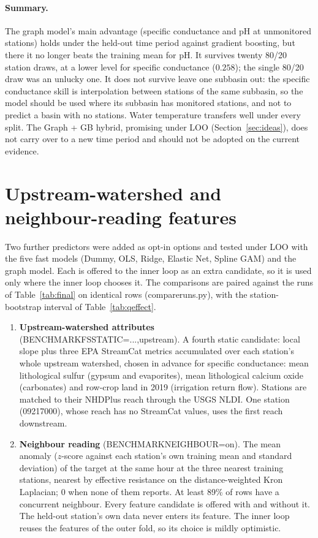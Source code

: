 \documentclass[11pt]{article}
\newcommand{\codeus}{\textunderscore\allowbreak}
\newcommand{\code}[1]{{\ttfamily\let\_\codeus #1}}
\begin{document}
\paragraph{Summary.} The graph model's main advantage (specific conductance and pH at unmonitored
stations) holds under the held-out time period against gradient boosting, but there it no longer
beats the training mean for pH. It survives twenty 80/20 station draws, at a lower level for
specific conductance ($0.258$); the single 80/20 draw was an unlucky one. It does not survive leave
one subbasin out: the specific conductance skill is interpolation between stations of the same
subbasin, so the model should be used where its subbasin has monitored stations, and not to
predict a basin with no stations. Water temperature transfers well under every split. The Graph +
GB hybrid, promising under LOO (Section~\ref{sec:ideas}), does not carry over to a new time period
and should not be adopted on the current evidence.

\section{Upstream-watershed and neighbour-reading features}
\label{sec:features}

Two further predictors were added as opt-in options and tested under LOO with the five fast models
(Dummy, OLS, Ridge, Elastic Net, Spline GAM) and the graph model. Each is offered to the inner loop
as an extra candidate, so it is used only where the inner loop chooses it. The comparisons are paired
against the runs of Table~\ref{tab:final} on identical rows (\code{compare\_runs.py}), with the
station-bootstrap interval of Table~\ref{tab:qeffect}.
\begin{enumerate}
  \item \textbf{Upstream-watershed attributes} (\code{BENCHMARK\_FS\_STATIC=...,upstream}). A fourth
        static candidate: local slope plus three EPA StreamCat metrics accumulated over each
        station's whole upstream watershed, chosen in advance for specific conductance: mean
        lithological sulfur (gypsum and evaporites), mean lithological calcium oxide (carbonates)
        and row-crop land in 2019 (irrigation return flow). Stations are matched to their NHDPlus
        reach through the USGS NLDI. One station (09217000), whose reach has no StreamCat values,
        uses the first reach downstream.
  \item \textbf{Neighbour reading} (\code{BENCHMARK\_NEIGHBOUR=on}). The mean anomaly ($z$-score
        against each station's own training mean and standard deviation) of the target at the same
        hour at the three nearest training stations, nearest by effective resistance on the
        distance-weighted Kron Laplacian; $0$ when none of them reports. At least 89\% of rows have
        a concurrent neighbour. Every feature candidate is offered with and without it. The
        held-out station's own data never enters its feature. The inner loop reuses the features
        of the outer fold, so its choice is mildly optimistic.
\end{enumerate}
\end{document}
